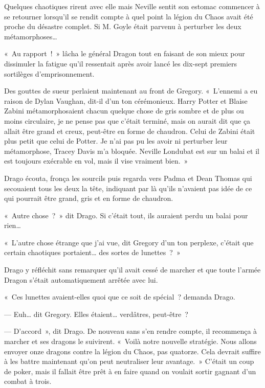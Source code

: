 Quelques chaotiques rirent avec elle mais Neville sentit son estomac commencer à se retourner lorsqu'il se rendit compte à quel point la légion du Chaos avait été proche du désastre complet.
Si M. Goyle était parvenu à perturber les deux métamorphoses…

\later

«~Au rapport~!~»
lâcha le général Dragon tout en faisant de son mieux pour dissimuler la fatigue qu'il ressentait après avoir lancé les dix-sept premiers sortilèges d'emprisonnement.

Des gouttes de sueur perlaient maintenant au front de Gregory.
«~L'ennemi a eu raison de Dylan Vaughan, dit-il d'un ton cérémonieux.
Harry Potter et Blaise Zabini métamorphosaient chacun quelque chose de gris sombre et de plus ou moins circulaire, je ne pense pas que c'était terminé, mais on aurait dit que ça allait être grand et creux, peut-être en forme de chaudron.
Celui de Zabini était plus petit que celui de Potter.
Je n'ai pas pu les avoir ni perturber leur métamorphose, Tracey Davis m'a bloquée.
Neville Londubat est sur un balai et il est toujours exécrable en vol, mais il vise vraiment bien.~»

Drago écouta, fronça les sourcils puis regarda vers Padma et Dean Thomas qui secouaient tous les deux la tête, indiquant par là qu'ils n'avaient pas idée de ce qui pourrait être grand, gris et en forme de chaudron.

«~Autre chose~?~»
dit Drago.
Si c'était tout, ils auraient perdu un balai pour rien…

«~L'autre chose étrange que j'ai vue, dit Gregory d'un ton perplexe, c'était que certain chaotiques portaient… des sortes de lunettes~?~»

Drago y réfléchit sans remarquer qu'il avait cessé de marcher et que toute l'armée Dragon s'était automatiquement arrêtée avec lui.

«~Ces lunettes avaient-elles quoi que ce soit de spécial~? demanda Drago.

--- Euh… dit Gregory.
Elles étaient… verdâtres, peut-être~?

--- D'accord~», dit Drago.
De nouveau sans s'en rendre compte, il recommença à marcher et ses dragons le suivirent.
«~Voilà notre nouvelle stratégie.
Nous allons envoyer onze dragons contre la légion du Chaos, pas quatorze.
Cela devrait suffire à les battre maintenant qu'on peut neutraliser leur avantage.~»
C'était un coup de poker, mais il fallait être prêt à en faire quand on voulait sortir gagnant d'un combat à trois.


